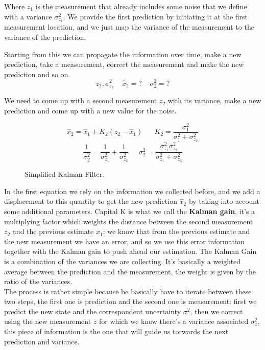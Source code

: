 Where $z_1$ is the measurement that already includes some noise that we define with a variance $\sigma^2_{z_1}$. We provide the first prediction by initiating it at the first measurement location, and we just map the variance of the measurement to the variance of the prediction.

Starting from this we can propagate the information over time, make a new prediction, take a measurement, correct the measurement and make the new prediction and so on.
\[
    z_2, \sigma^2_{z_2}\;\;\;\;\hat{x}_2=?\;\;\;\;\sigma^2_2=?    
\]

We need to come up with a second measurement $z_2$ with its variance, make a new prediction and come up with a new value for the noise.

\begin{figure}[H]    
\[
    \hat{x}_2 = \hat{x}_1 + K_2(z_2-\hat{x}_1) \;\;\;\;\;\; K_2 = \frac{\sigma^2_1}{\sigma^2_1+\sigma^2_{z_2}}  
\]
\[
    \frac{1}{\sigma^2_2} = \frac{1}{\sigma^2_{z_1}}+\frac{1}{\sigma^2_{z_2}}\;\;\;\;\;
    \sigma^2_2 = \frac{\sigma^2_{z_1}\sigma^2_{z_2}}{\sigma^2_{z_1}+\sigma^2_{z_2}} 
\]
\caption{Simplified Kalman Filter.}
\label{eq:kalman}
\end{figure}
In the first equation we rely on the information we collected before, and we add a displacement to this quantity to get the new prediction $\hat{x}_2$ by taking into account some additional parameters. Capital K is what we call the \textbf{Kalman gain}, it's a multiplying factor which weights the distance between the second measurement $z_2$ and the previous estimate $\hat{x}_1$: we know that from the previous estimate and the new measurement we have an error, and so we use this error information together with the Kalman gain to push ahead our estimation. The Kalman Gain is a combination of the variances we are collecting. It's basically a weighted average between the prediction and the measurement, the weight is given by the ratio of the variances. 
\\

The process is rather simple because be basically have to iterate between these two steps, the first one is prediction and the second one is measurement: first we predict the new state and the correspondent uncertainty $\sigma^2$, then we correct using the new measurement $z$ for which we know there's a variance associated $\sigma^2_z$, this piece of information is the one that will guide us torwards the next prediction and variance.
\\

